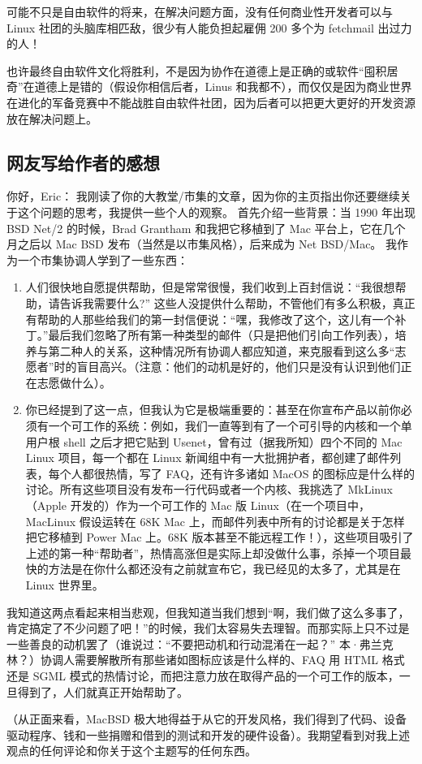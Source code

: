 可能不只是自由软件的将来，在解决问题方面，没有任何商业性开发者可以与 Linux 社团的头脑库相匹敌，很少有人能负担起雇佣 200 多个为 fetchmail 出过力的人！


也许最终自由软件文化将胜利，不是因为协作在道德上是正确的或软件“囤积居奇”在道德上是错的（假设你相信后者，Linus 和我都不），而仅仅是因为商业世界在进化的军备竞赛中不能战胜自由软件社团，因为后者可以把更大更好的开发资源放在解决问题上。

\subsection{网友写给作者的感想}

你好，Eric：
我刚读了你的大教堂/市集的文章，因为你的主页指出你还要继续关于这个问题的思考，我提供一些个人的观察。 首先介绍一些背景：当 1990 年出现 BSD Net/2 的时候，Brad Grantham 和我把它移植到了 Mac 平台上，它在几个月之后以 Mac BSD 发布（当然是以市集风格），后来成为 Net BSD/Mac。 我作为一个市集协调人学到了一些东西：

\begin{enumerate}
\item 人们很快地自愿提供帮助，但是常常很慢，我们收到上百封信说：“我很想帮助，请告诉我需要什么?” 这些人没提供什么帮助，不管他们有多么积极，真正有帮助的人那些给我们的第一封信便说：“嘿，我修改了这个，这儿有一个补丁。”最后我们忽略了所有第一种类型的邮件（只是把他们引向工作列表），培养与第二种人的关系，这种情况所有协调人都应知道，来克服看到这么多“志愿者”时的盲目高兴。（注意：他们的动机是好的，他们只是没有认识到他们正在志愿做什么）。

\item 你已经提到了这一点，但我认为它是极端重要的：甚至在你宣布产品以前你必须有一个可工作的系统：例如，我们一直等到有了一个可引导的内核和一个单用户根 shell 之后才把它贴到 Usenet，曾有过（据我所知）四个不同的 Mac Linux 项目，每一个都在 Linux 新闻组中有一大批拥护者，都创建了邮件列表，每个人都很热情，写了 FAQ，还有许多诸如 MacOS 的图标应是什么样的讨论。所有这些项目没有发布一行代码或者一个内核、我挑选了 MkLinux（Apple 开发的）作为一个可工作的 Mac 版 Linux（在一个项目中，MacLinux 假设运转在 68K Mac 上，而邮件列表中所有的讨论都是关于怎样把它移植到 Power Mac 上。68K 版本甚至不能远程工作！），这些项目吸引了上述的第一种“帮助者”，热情高涨但是实际上却没做什么事，杀掉一个项目最快的方法是在你什么都还没有之前就宣布它，我已经见的太多了，尤其是在 Linux 世界里。
\end{enumerate}

我知道这两点看起来相当悲观，但我知道当我们想到“啊，我们做了这么多事了，肯定搞定了不少问题了吧！”的时候，我们太容易失去理智。而那实际上只不过是一些善良的动机罢了（谁说过：“不要把动机和行动混淆在一起？” 本·弗兰克林？）协调人需要解散所有那些诸如图标应该是什么样的、FAQ 用 HTML 格式还是 SGML 模式的热情讨论，而把注意力放在取得产品的一个可工作的版本，一旦得到了，人们就真正开始帮助了。

（从正面来看，MacBSD 极大地得益于从它的开发风格，我们得到了代码、设备驱动程序、钱和一些捐赠和借到的测试和开发的硬件设备）。我期望看到对我上述观点的任何评论和你关于这个主题写的任何东西。
